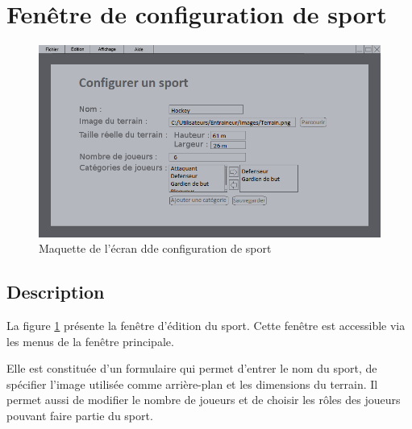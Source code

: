 \section{Fenêtre de configuration de sport}

\begin{figure}[H]
	\centering
	\includegraphics[width=\textwidth]{mockup/mockupSport.png}
	\caption{Maquette de l'écran dde configuration de sport}
	\label{fig:mock-up-sport}
\end{figure}

\subsection{Description}

La figure \ref{fig:mock-up-sport} présente la fenêtre d'édition du sport. Cette fenêtre est accessible via les menus de la fenêtre principale.

Elle est constituée d'un formulaire qui permet d'entrer le nom du sport, de spécifier l'image utilisée comme arrière-plan et les dimensions du terrain. Il permet aussi de modifier le nombre de joueurs et de choisir les rôles des joueurs pouvant faire partie du sport.